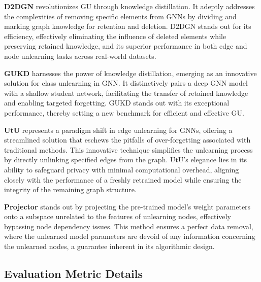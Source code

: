 \textbf{D2DGN} \cite{2024D2DGN} revolutionizes GU through knowledge distillation. It adeptly addresses the complexities of removing specific elements from GNNs by dividing and marking graph knowledge for retention and deletion. D2DGN stands out for its efficiency, effectively eliminating the influence of deleted elements while preserving retained knowledge, and its superior performance in both edge and node unlearning tasks across real-world datasets.



\textbf{GUKD} \cite{2023GUKD} harnesses the power of knowledge distillation, emerging as an innovative solution for class unlearning in GNN. It distinctively pairs a deep GNN model with a shallow student network, facilitating the transfer of retained knowledge and enabling targeted forgetting. GUKD stands out with its exceptional performance, thereby setting a new benchmark for efficient and effective GU.

 
\textbf{UtU} \cite{Tan2024UtU} represents a paradigm shift in edge unlearning for GNNs, offering a streamlined solution that eschews the pitfalls of over-forgetting associated with traditional methods. This innovative technique simplifies the unlearning process by directly unlinking specified edges from the graph. UtU's elegance lies in its ability to safeguard privacy with minimal computational overhead, aligning closely with the performance of a freshly retrained model while ensuring the integrity of the remaining graph structure. 


\textbf{Projector} \cite{cong2023projector} stands out by projecting the pre-trained model's weight parameters onto a subspace unrelated to the features of unlearning nodes, effectively bypassing node dependency issues. This method ensures a perfect data removal, where the unlearned model parameters are devoid of any information concerning the unlearned nodes, a guarantee inherent in its algorithmic design. 



\subsection{Evaluation Metric Details}
\label{A.Evaluation Metrics}

